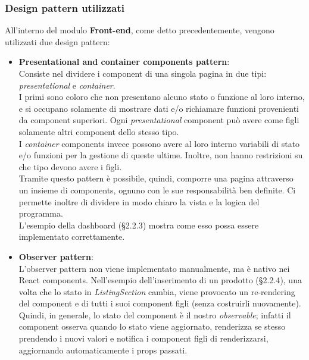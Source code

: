 \subsubsection{Design pattern utilizzati}
All'interno del modulo \textbf{Front-end}, come detto precedentemente, vengono utilizzati due design pattern:
\begin{itemize}
	\item \textbf{Presentational and container components pattern}:\\ 
	Consiste nel dividere i component di una singola pagina in due tipi: \textit{presentational} e \textit{container}.\\
	 I primi sono coloro che non presentano alcuno stato o funzione al loro interno, e si occupano solamente di mostrare dati e/o richiamare funzioni provenienti da component superiori. Ogni \textit{presentational} component può avere come figli solamente altri component dello stesso tipo. \\
	 I \textit{container} components invece possono avere al loro interno variabili di stato e/o funzioni per la gestione di queste ultime. Inoltre, non hanno restrizioni su che tipo devono avere i figli.\\
	 Tramite questo pattern è possibile, quindi, comporre una pagina attraverso un insieme di components, ognuno con le sue responsabilità ben definite. Ci permette inoltre di dividere in modo chiaro la vista e la logica del programma.\\
	 L'esempio della dashboard (\S{2.2.3}) mostra come esso possa essere implementato correttamente.
	\item \textbf{Observer pattern}: \\L'observer pattern non viene implementato manualmente, ma è nativo nei React components. Nell'esempio dell'inserimento di un prodotto (\S{2.2.4}), una volta che lo stato in \textit{ListingSection} cambia, viene provocato un re-rendering del component e di tutti i suoi component figli (senza costruirli nuovamente).\\ Quindi, in generale, lo stato del component è il nostro \textit{observable}; infatti il component osserva quando lo stato viene aggiornato, renderizza se stesso prendendo i nuovi valori e notifica i component figli di renderizzarsi, aggiornando automaticamente i props passati.
\end{itemize} 